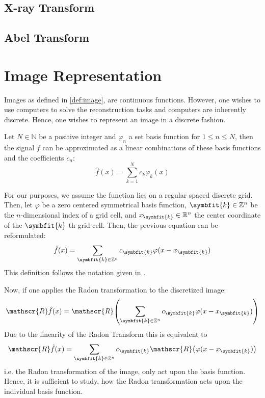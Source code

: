 
\section{X-ray Transform}\label{sec:xray_transform}

\section{Abel Transform}\label{sec:abel_transform}

\chapter{Image Representation}\label{chap:image_representation}

Images as defined in \ref{def:image}, are continuous functions. However, one wishes to use computers
to solve the reconstruction tasks and computers are inherently discrete. Hence, one wishes to
represent an image in a discrete fashion.

\begin{definition}
	\label{def:permissible_representation}
	Let \(N \in \mathbb{N}\) be a positive integer and \(\varphi_n\) a set basis function for
	\(1 \leq n \leq N\), then the signal \(f\) can be approximated as a linear combinations
	of these basis functions and the coefficients \(c_n\):
	\[ \hat{f}(x) = \sum_{k=1}^{N} c_k \varphi_k(x) \]
\end{definition}

For our purposes, we assume the function lies on a regular spaced discrete grid. Then, let
\(\varphi\) be a zero centered symmetrical basis function, \(\symbfit{k} \in \mathbb{Z}^n\) be the
\(n\)-dimensional index of a grid cell, and \(x_{\symbfit{k}} \in \mathbb{R}^n\) the center coordinate
of the \(\symbfit{k}\)-th grid cell. Then, the previous equation can be reformulated:
\[ \hat{f}(x) = \sum_{\symbfit{k} \in \mathbb{Z}^n} c_{\symbfit{k}} \varphi(x - x_{\symbfit{k}}) \]
This definition follows the notation given in \cite{momey_new_2011}.


Now, if one applies the Radon transformation to the discretized image: 
\[ \mathscr{R}\hat{f}(x) = \mathscr{R}\left( \sum_{\symbfit{k} \in \mathbb{Z}^n} c_{\symbfit{k}} \varphi(x - x_{\symbfit{k}}) \right) \]
Due to the linearity of the Radon Transform this is equivalent to \[ \mathscr{R}\hat{f}(x) =  \sum_{\symbfit{k} \in \mathbb{Z}^n} c_{\symbfit{k}}\mathscr{R}\left( \varphi(x - x_{\symbfit{k}}) \right) \]
i.e. the Radon transformation of the image, only act upon the basis function. Hence, it is
sufficient to study, how the Radon transformation acts upon the individual basis function.

